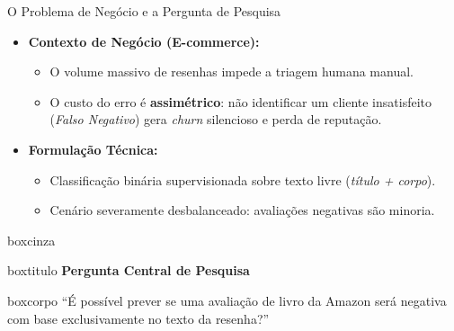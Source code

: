 \documentclass[aspectratio=43]{beamer}
\begin{document}
\begin{frame}[t]{O Problema de Negócio e a Pergunta de Pesquisa}

\vspace{0.05cm}

\begin{itemize}
    \item \textbf{Contexto de Negócio (E-commerce):}
    \begin{itemize}
        \item O volume massivo de resenhas impede a triagem humana manual.
        \item O custo do erro é \textbf{assimétrico}: não identificar um cliente insatisfeito (\textit{Falso Negativo}) gera \textit{churn} silencioso e perda de reputação.
    \end{itemize}

    \vspace{0.15cm}

    \item \textbf{Formulação Técnica:}
    \begin{itemize}
        \item Classificação binária supervisionada sobre texto livre (\textit{título + corpo}).
        \item Cenário severamente desbalanceado: avaliações negativas são minoria.
    \end{itemize}
\end{itemize}

\vspace{0.12cm}

\begin{center}
\begin{beamercolorbox}[wd=0.96\textwidth, sep=0pt]{boxcinza}
  \begin{beamercolorbox}[wd=0.96\textwidth, ht=0.45cm, dp=0.08cm, leftskip=0.22cm]{boxtitulo}
    {\normalsize\color{uelgreen}\textbf{Pergunta Central de Pesquisa}}
  \end{beamercolorbox}
  \begin{beamercolorbox}[wd=0.96\textwidth, sep=0.18cm]{boxcorpo}
    \small
    ``É possível prever se uma avaliação de livro da Amazon será negativa com base exclusivamente no texto da resenha?''
  \end{beamercolorbox}
\end{beamercolorbox}
\end{center}

\end{frame}
\end{document}

